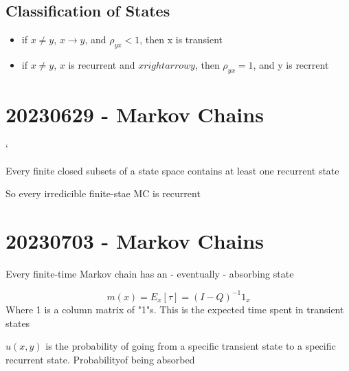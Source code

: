\documentclass{report}
\begin{document}
    \section*{ Classification of States}
     {
      \begin{itemize}
        \item if $x \neq y$, $x \rightarrow y$, and $\rho_{yx} < 1$, then x is transient
        \item if $x \neq y$, $x$ is recurrent and $x rightarrow y$, then $\rho_{yx} = 1$, and y is recrrent
      \end{itemize}
    }
\chapter*{20230629 - Markov Chains}
    `
   {
    Every finite closed subsets of a state space contains at least one recurrent state

    So every irredicible finite-stae MC is recurrent
  }


\chapter*{20230703 - Markov Chains}

  Every finite-time Markov chain has an  - eventually - absorbing state

  \[ m(x) = E_x[\tau] = (I-Q)^{-1} 1_{x} \]
    Where 1 is a column matrix of "1"s.  This is the expected time
    spent in transient states

    $u(x,y)$ is the probability of going from a specific transient
    state to a specific recurrent state. Probabilityof being absorbed
\end{document}
